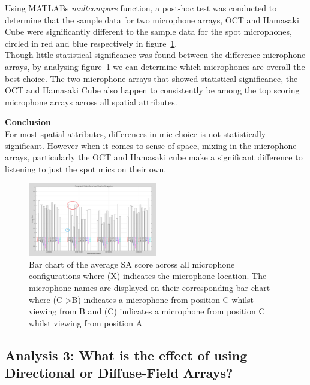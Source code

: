 		Using MATLABs \textit{multcompare} function, a post-hoc test was conducted to determine that the sample data for two microphone arrays, OCT and Hamasaki Cube were significantly different to the sample data for the spot microphones, circled in red and blue respectively in figure~\ref{image:sa_allmics}. \\

		Though little statistical significance was found between the difference microphone arrays, by analysing figure~\ref{image:sa_allmics} we can determine which microphones are overall the best choice. The two microphone arrays that showed statistical significance, the OCT and Hamasaki Cube also happen to consistently be among the top scoring microphone arrays across all spatial attributes.

		\textbf{Conclusion} \\

		For most spatial attributes, differences in mic choice is not statistically significant. However when it comes to sense of space, mixing in the microphone arrays, particularly the OCT and Hamasaki cube make a significant difference to listening to just the spot mics on their own.

		\begin{figure}
			\includegraphics[width=0.5\textwidth]{images/plots/allMics_edit.PNG}
			\caption{Bar chart of the average SA score across all microphone configurations where (X) indicates the microphone location. The microphone names are displayed on their corresponding bar chart where (C->B) indicates a microphone from position C whilst viewing from B and (C) indicates a microphone from position C whilst viewing from position A}
			\label{image:sa_allmics} 
		\end{figure}


	\subsection{Analysis 3: What is the effect of using Directional or Diffuse-Field Arrays?}
	\label{ana3}

